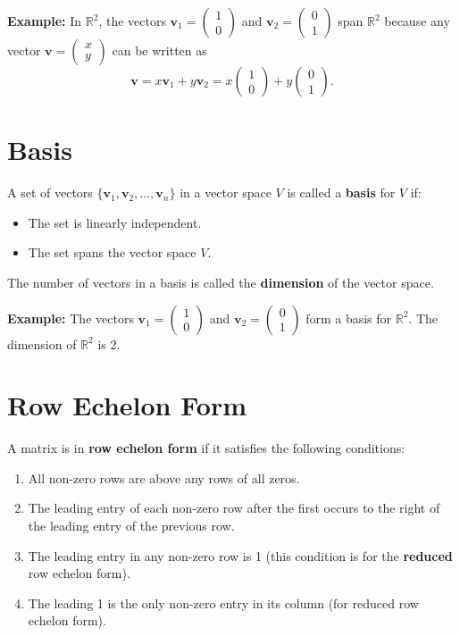 \documentclass[]{article}
\begin{document}
	\textbf{Example:} In $\mathbb{R}^2$, the vectors $\mathbf{v}_1 = \begin{pmatrix} 1 \\ 0 \end{pmatrix}$ and $\mathbf{v}_2 = \begin{pmatrix} 0 \\ 1 \end{pmatrix}$ span $\mathbb{R}^2$ because any vector $\mathbf{v} = \begin{pmatrix} x \\ y \end{pmatrix}$ can be written as
	\[
	\mathbf{v} = x\mathbf{v}_1 + y\mathbf{v}_2 = x\begin{pmatrix} 1 \\ 0 \end{pmatrix} + y\begin{pmatrix} 0 \\ 1 \end{pmatrix}.
	\]
	
	\section{Basis}
	
	A set of vectors $\{\mathbf{v}_1, \mathbf{v}_2, \dots, \mathbf{v}_n\}$ in a vector space $V$ is called a \textbf{basis} for $V$ if:
	\begin{itemize}
		\item The set is linearly independent.
		\item The set spans the vector space $V$.
	\end{itemize}
	
	The number of vectors in a basis is called the \textbf{dimension} of the vector space.
	
	\textbf{Example:} The vectors $\mathbf{v}_1 = \begin{pmatrix} 1 \\ 0 \end{pmatrix}$ and $\mathbf{v}_2 = \begin{pmatrix} 0 \\ 1 \end{pmatrix}$ form a basis for $\mathbb{R}^2$. The dimension of $\mathbb{R}^2$ is 2.
	
	\section{Row Echelon Form}
	
	A matrix is in \textbf{row echelon form} if it satisfies the following conditions:
	\begin{enumerate}
		\item All non-zero rows are above any rows of all zeros.
		\item The leading entry of each non-zero row after the first occurs to the right of the leading entry of the previous row.
		\item The leading entry in any non-zero row is 1 (this condition is for the \textbf{reduced} row echelon form).
		\item The leading 1 is the only non-zero entry in its column (for reduced row echelon form).
	\end{enumerate}
	
\end{document}

